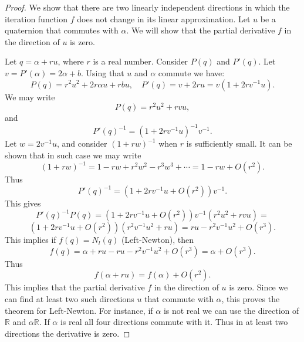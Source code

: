 \documentclass{article}
\theoremstyle{definition}
\begin{document}
\begin{proof}   We show that there are two linearly independent directions in which the iteration function $f$ does not change in its linear approximation.  Let $u$ be a quaternion that commutes with $\alpha$.
We will show that the partial derivative $f$ in the direction of $u$ is zero.

Let $q= \alpha +r u$, where $r$ is a real number.  Consider $P(q)$ and $P'(q)$.  Let $v= P'(\alpha)=2 \alpha +b$. Using that $u$ and $\alpha$ commute we have:
\begin{equation}
P(q)=r^2u^2+2r\alpha u+ r bu,  \quad P'(q)=v+ 2r u=v (1+ 2rv^{-1}u).
\end{equation}
We may write
\begin{equation}
P(q)=r^2u^2+rvu,
\end{equation}
and
\begin{equation}
P'(q)^{-1}= (1+ 2rv^{-1}u)^{-1}v^{-1}.
\end{equation}
Let
$w=2v^{-1}u$, and consider $(1+r w)^{-1}$ when $r$ is sufficiently small.  It can be shown that in such case we may write
\begin{equation}
(1+ r w)^{-1}= 1 - rw +r^2w^2 - r^3w^3 + \cdots = 1-rw + O(r^2).
\end{equation}
Thus
\begin{equation}
P'(q)^{-1}= (1+ 2rv^{-1}u + O(r^2))v^{-1}.
\end{equation}
This gives
\begin{equation}
P'(q)^{-1}P(q)= (1+ 2rv^{-1}u + O(r^2))v^{-1} (r^2u^2+rvu)=
\end{equation}
\begin{equation}
(1+ 2rv^{-1}u + O(r^2))(r^2v^{-1}u^2+ru)= ru- r^2v^{-1}u^2 + O(r^3).
\end{equation}
This implies if $f(q)=N_l(q)$ (Left-Newton), then
\begin{equation}
f(q)=\alpha + ru - ru- r^2v^{-1}u^2 + O(r^3)= \alpha +  O(r^3).
\end{equation}
Thus
\begin{equation}
f(\alpha + r u)=f(\alpha) +O(r^2).
\end{equation}
This implies that the partial derivative $f$ in the direction of $u$ is zero.  Since we can find at least two such directions $u$ that commute with $\alpha$, this proves the theorem for Left-Newton. For instance, if $\alpha$ is not real we can use the direction of $\mathbb{R}$ and $\alpha \mathbb{R}$. If $\alpha$ is real all four directions commute with it.  Thus in at least two directions the derivative is zero.


\end{proof}
\end{document}
